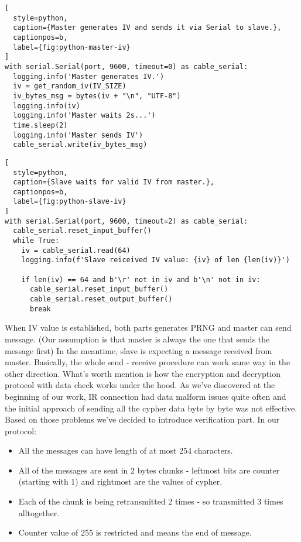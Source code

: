 
\begin{lstlisting}[
  style=python,
  caption={Master generates IV and sends it via Serial to slave.},
  captionpos=b,
  label={fig:python-master-iv}
]
with serial.Serial(port, 9600, timeout=0) as cable_serial:
  logging.info('Master generates IV.')
  iv = get_random_iv(IV_SIZE)
  iv_bytes_msg = bytes(iv + "\n", "UTF-8")
  logging.info(iv)
  logging.info('Master waits 2s...')
  time.sleep(2)
  logging.info('Master sends IV')
  cable_serial.write(iv_bytes_msg)
\end{lstlisting}

\begin{lstlisting}[
  style=python,
  caption={Slave waits for valid IV from master.},
  captionpos=b,
  label={fig:python-slave-iv}
]
with serial.Serial(port, 9600, timeout=2) as cable_serial:
  cable_serial.reset_input_buffer()
  while True:
    iv = cable_serial.read(64)
    logging.info(f'Slave reiceived IV value: {iv} of len {len(iv)}')

    if len(iv) == 64 and b'\r' not in iv and b'\n' not in iv:
      cable_serial.reset_input_buffer()
      cable_serial.reset_output_buffer()
      break
\end{lstlisting}

When IV value is established, both parts generates PRNG and master can send message. (Our assumption is that master is always the one that sends the message first) In the meantime, slave is expecting a message received from master. Basically, the whole send - receive procedure can work same way in the other direction. What's worth mention is how the encryption and decryption protocol with data check works under the hood. As we've discovered at the beginning of our work, IR connection had data malform issues quite often and the initial approach of sending all the cypher data byte by byte was not effective. Based on those problems we've decided to introduce verification part. In our protocol:

\begin{itemize}
  \item {All the messages can have length of at most 254 characters.}
  \item {All of the messages are sent in 2 bytes chunks - leftmost bits are counter (starting with 1) and rightmost are the values of cypher.}
  \item {Each of the chunk is being retransmitted 2 times - so transmitted 3 times alltogether. }
  \item { Counter value of 255 is restricted and means the end of message.}
\end{itemize}

